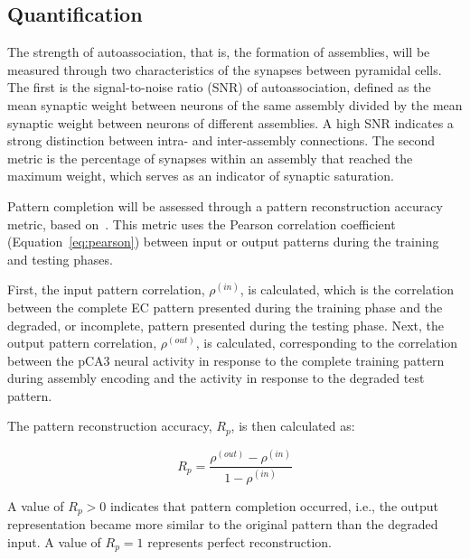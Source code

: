 \subsection{Quantification}\label{sec:quantificacao}

The strength of autoassociation, that is, the formation of assemblies, will be measured through two characteristics of the
synapses between pyramidal cells. The first is the signal-to-noise ratio (SNR) of autoassociation, defined as the mean synaptic
weight between neurons of the same assembly divided by the mean synaptic weight between neurons of different assemblies. A high
SNR indicates a strong distinction between intra- and inter-assembly connections. The second metric is the percentage of
synapses within an assembly that reached the maximum weight, which serves as an indicator of synaptic saturation.

Pattern completion will be assessed through a pattern reconstruction accuracy metric, based
on~\parencite{kopsickFormation2024}. This metric uses the Pearson correlation coefficient (Equation~\ref{eq:pearson}) between input
or output patterns during the training and testing phases.

First, the input pattern correlation, $\rho^{(in)}$, is calculated, which is the correlation between the complete EC pattern
presented during the training phase and the degraded, or incomplete, pattern presented during the testing phase. Next, the
output pattern correlation, $\rho^{(out)}$, is calculated, corresponding to the correlation between the pCA3 neural activity
in response to the complete training pattern during assembly encoding and the activity in response to the degraded test pattern.

The pattern reconstruction accuracy, $R_p$, is then calculated as:

\begin{equation}
    \label{eq:rp}
    R_p = \frac{\rho^{(out)} - \rho^{(in)}}{1 - \rho^{(in)}}
\end{equation}

A value of $R_p > 0$ indicates that pattern completion occurred, i.e., the output representation became more similar to the
original pattern than the degraded input. A value of $R_p = 1$ represents perfect reconstruction.
